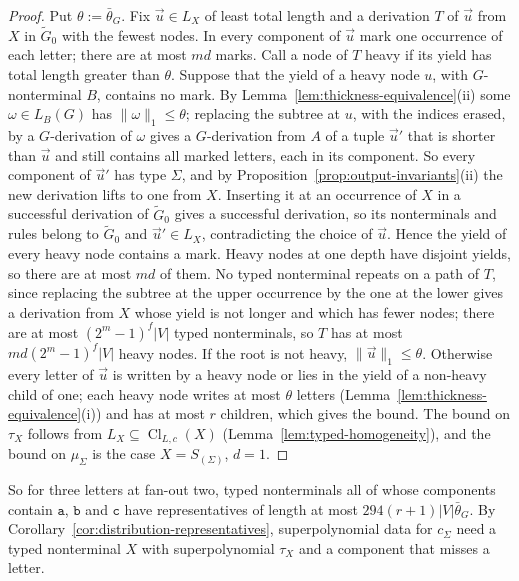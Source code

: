 \documentclass[11pt]{article}
\numberwithin{equation}{section}
\theoremstyle{plain}
\theoremstyle{definition}
\theoremstyle{remark}
\newcommand{\tuple}[1]{\vec{#1}}
\theoremstyle{plain}
\begin{document}
\begin{proof}
Put $\theta:=\bar\theta_G$.  Fix $\tuple u\in L_X$ of least total length and a
derivation $T$ of $\tuple u$ from $X$ in $\widetilde G_0$ with the fewest nodes.
In every component of $\tuple u$ mark one occurrence of each letter; there are at
most $md$ marks.  Call a node of $T$ heavy if its yield has total length greater
than $\theta$.  Suppose that the yield of a heavy node $u$, with $G$-nonterminal
$B$, contains no mark.  By Lemma~\ref{lem:thickness-equivalence}(ii) some
$\omega\in L_B(G)$ has $\|\omega\|_1\le\theta$; replacing the subtree at $u$, with
the indices erased, by a $G$-derivation of $\omega$ gives a $G$-derivation from
$A$ of a tuple $\tuple u'$ that is shorter than $\tuple u$ and still contains all
marked letters, each in its component.  So every component of $\tuple u'$ has
type $\Sigma$, and by Proposition~\ref{prop:output-invariants}(ii) the new
derivation lifts to one from $X$.  Inserting it at an occurrence of $X$ in a
successful derivation of $\widetilde G_0$ gives a successful derivation, so its
nonterminals and rules belong to $\widetilde G_0$ and $\tuple u'\in L_X$,
contradicting the choice of $\tuple u$.  Hence the yield of every heavy node
contains a mark.  Heavy nodes at one depth have disjoint yields, so there are at
most $md$ of them.  No typed nonterminal repeats on a path of $T$, since
replacing the subtree at the upper occurrence by the one at the lower gives a
derivation from $X$ whose yield is not longer and which has fewer nodes; there
are at most $(2^m-1)^f|V|$ typed nonterminals, so $T$ has at most
$md(2^m-1)^f|V|$ heavy nodes.  If the root is not heavy,
$\|\tuple u\|_1\le\theta$.  Otherwise every letter of $\tuple u$ is written by a
heavy node or lies in the yield of a non-heavy child of one; each heavy node
writes at most $\theta$ letters (Lemma~\ref{lem:thickness-equivalence}(i)) and has
at most $r$ children, which gives the bound.  The bound on $\tau_X$ follows from
$L_X\subseteq\operatorname{Cl}_{L,c}(X)$ (Lemma~\ref{lem:typed-homogeneity}), and
the bound on $\mu_\Sigma$ is the case $X=S_{(\Sigma)}$, $d=1$.
\end{proof}

So for three letters at fan-out two, typed nonterminals all of whose components
contain $\mathtt a$, $\mathtt b$ and $\mathtt c$ have representatives of length at
most $294(r+1)|V|\bar\theta_G$.  By
Corollary~\ref{cor:distribution-representatives}, superpolynomial data for
$c_\Sigma$ need a typed nonterminal $X$ with superpolynomial $\tau_X$ and a
component that misses a letter.
\end{document}
